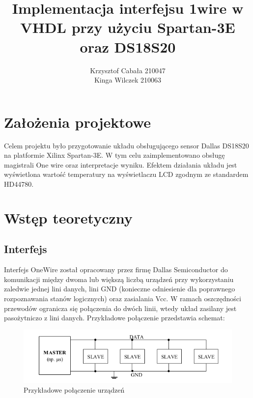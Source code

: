 \documentclass[a4paper]{article}
\title{\vspace{80mm}Implementacja interfejsu 1wire w VHDL przy użyciu Spartan-3E oraz DS18S20}
\author{Krzysztof Cabała 210047\\ Kinga Wilczek 210063\vspace{110mm}}
\begin{document}
\maketitle
\thispagestyle{empty}

\tableofcontents
\newpage
{}
\listoffigures

\newpage

\section{Założenia projektowe}

Celem projektu było przygotowanie układu obsługującego sensor Dallas DS18S20 na platformie Xilinx Spartan-3E. W tym celu zaimplementowano obsługę magistrali One wire oraz interpretacje wyniku. Efektem działania układu jest wyświetlona wartość temperatury na wyświetlaczu LCD zgodnym ze standardem HD44780.

\section{Wstęp teoretyczny}
\subsection{Interfejs}
Interfejs OneWire został opracowany przez firmę Dallas Semiconductor \cite{bib_kom} do komunikacji między dwoma lub większą liczbą urządzeń przy wykorzystaniu zaledwie jednej lini danych, lini GND (konieczne odniesienie dla poprawnego rozpoznawania stanów logicznych) oraz zasialania Vcc. 
W ramach oszczędności przewodów ogranicza się połączenia do dwóch linii, wtedy układ zasilany jest pasożytniczo z lini danych.
Przykładowe połączenie przedstawia schemat:

\begin{figure}[h]
\begin{center}
\includegraphics[scale=0.3]{graphics/idea.png}
\end{center}
\caption{Przykładowe połączenie urządzeń}
\label{schemonewire}
\end{figure}
\end{document}
